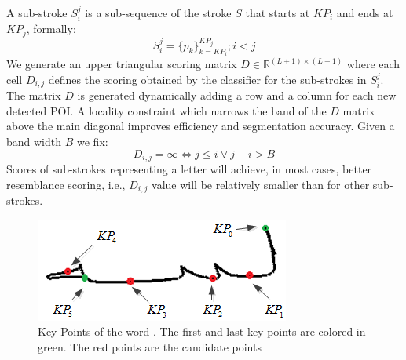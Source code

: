 \documentclass[journal,compsoc]{IEEEtran}
\begin{document}
A sub-stroke $S_{i}^{j}$ is a sub-sequence of the stroke $S$ that starts at $KP_{i}$ and ends at $KP_{j}$, formally:
\begin{equation}
S_{i}^{j}=\{p_{k}\}_{k=KP_{i}}^{KP_{j}}; i<j
\end{equation}
We generate an upper triangular scoring matrix $D\in\mathbb{R}^{(L+1)\times (L+1)}$ where each cell $D_{i,j}$ defines the scoring obtained by the classifier for the sub-strokes in $S_i^j$. 
The matrix $D$ is generated dynamically adding a row and a column for each new detected POI. 
A locality constraint which narrows the band of the $D$ matrix above the main diagonal improves efficiency and segmentation accuracy. Given a band width $B$ we fix:
\begin{equation}
D_{i,j}=\infty \Leftrightarrow j \leq i \vee j-i>B 
\end{equation}
Scores of sub-strokes representing a letter will achieve, in most cases, better resemblance scoring, i.e., $D_{i,j}$ value will be relatively smaller than for other sub-strokes.\\

\begin{figure}
\centering
\includegraphics[width=0.7\columnwidth]{./figures/candidate_points}
\caption{Key Points of the word . The first and last key points are colored in green. The red points are the candidate points}
\label{fig:candidate_points}
\end{figure}
\end{document}
